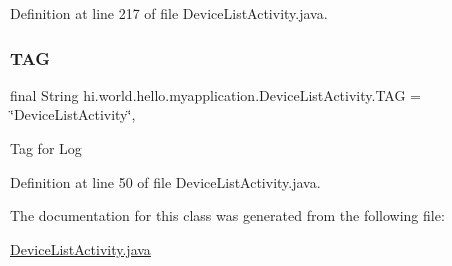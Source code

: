 Definition at line 217 of file Device\+List\+Activity.\+java.

\mbox{\label{classhi_1_1world_1_1hello_1_1myapplication_1_1_device_list_activity_a54fe4b51cb417f2ceac0f57b1e21d991}} 
\subsubsection{\texorpdfstring{TAG}{TAG}}
{\footnotesize\ttfamily final String hi.\+world.\+hello.\+myapplication.\+Device\+List\+Activity.\+T\+AG = \char`\"{}Device\+List\+Activity\char`\"{}\hspace{0.3cm}{\ttfamily [static]}, {\ttfamily [private]}}

Tag for Log 

Definition at line 50 of file Device\+List\+Activity.\+java.



The documentation for this class was generated from the following file\+:\begin{DoxyCompactItemize}
\item 
\mbox{\hyperlink{_device_list_activity_8java}{Device\+List\+Activity.\+java}}\end{DoxyCompactItemize}
